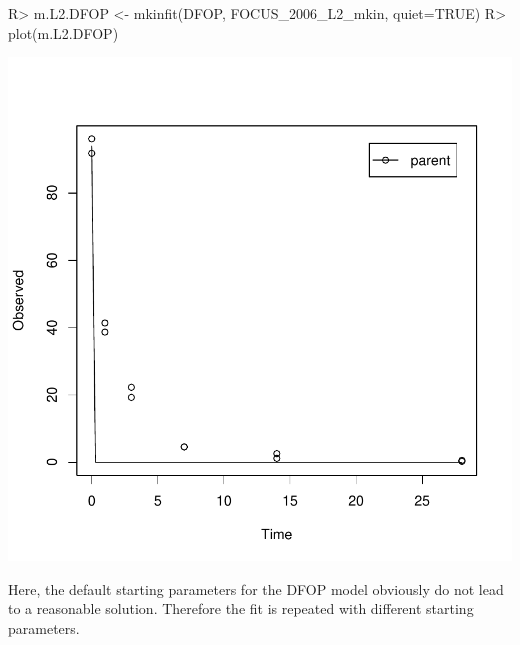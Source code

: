 \documentclass[12pt,a4paper]{article}
\begin{document}
\begin{Schunk}
\begin{Sinput}
R> m.L2.DFOP <- mkinfit(DFOP, FOCUS_2006_L2_mkin, quiet=TRUE)
R> plot(m.L2.DFOP)
\end{Sinput}
\end{Schunk}
\includegraphics{examples-L2_DFOP}

Here, the default starting parameters for the DFOP model obviously do not lead
to a reasonable solution. Therefore the fit is repeated with different starting
parameters.
\end{document}
